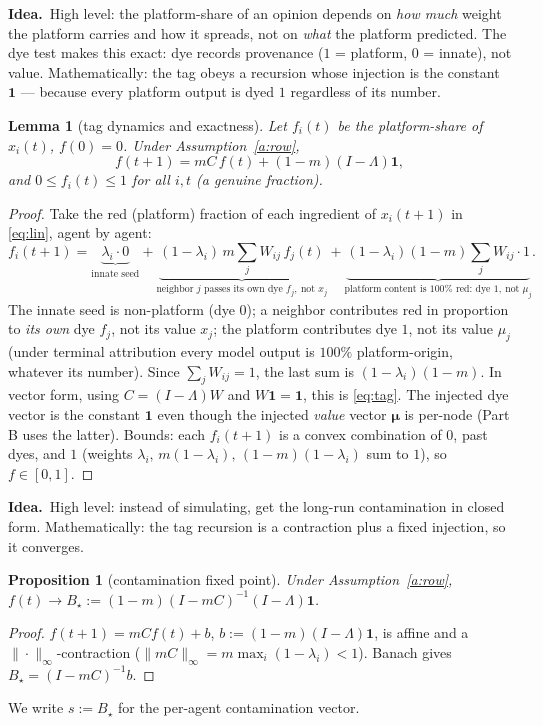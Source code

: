 \documentclass[11pt]{article}
\newtheorem{lemma}{Lemma}
\newtheorem{proposition}{Proposition}
\theoremstyle{definition}
\newcommand{\one}{\mathbf{1}}
\newcommand{\idea}[1]{\par\medskip\noindent\textbf{Idea.}\ #1\par\medskip}
\begin{document}
\idea{High level: the platform-share of an opinion depends on \emph{how much} weight the
platform carries and how it spreads, not on \emph{what} the platform predicted. The dye
test makes this exact: dye records provenance ($1$ = platform, $0$ = innate), not value.
Mathematically: the tag obeys a recursion whose injection is the constant $\one$ ---
because every platform output is dyed $1$ regardless of its number.}

\begin{lemma}[tag dynamics and exactness]\label{lem:tag}
Let $f_i(t)$ be the platform-share of $x_i(t)$, $f(0)=0$. Under Assumption~\ref{a:row},
\begin{equation}\label{eq:tag}
f(t+1)=mC\,f(t)+(1-m)(I-\Lambda)\one,
\end{equation}
and $0\le f_i(t)\le1$ for all $i,t$ (a genuine fraction).
\end{lemma}
\begin{proof}
Take the red (platform) fraction of each ingredient of $x_i(t+1)$ in \eqref{eq:lin},
agent by agent:
\[
f_i(t+1)=\underbrace{\lambda_i\cdot 0}_{\text{innate seed}}
+\underbrace{(1-\lambda_i)\,m\textstyle\sum_j W_{ij}\,f_j(t)}_{\text{neighbor }j\text{ passes its own dye }f_j,\ \text{not }x_j}
+\underbrace{(1-\lambda_i)(1-m)\textstyle\sum_j W_{ij}\cdot 1}_{\text{platform content is }100\%\text{ red: dye }1,\ \text{not }\mu_j}.
\]
The innate seed is non-platform (dye $0$); a neighbor contributes red in proportion to
\emph{its own} dye $f_j$, not its value $x_j$; the platform contributes dye $1$, not its
value $\mu_j$ (under terminal attribution every model output is $100\%$ platform-origin,
whatever its number). Since $\sum_j W_{ij}=1$, the last sum is $(1-\lambda_i)(1-m)$. In
vector form, using $C=(I-\Lambda)W$ and $W\one=\one$, this is \eqref{eq:tag}. The injected
dye vector is the constant $\one$ even though the injected \emph{value} vector $\bm{\mu}$
is per-node (Part B uses the latter). Bounds: each $f_i(t+1)$ is a convex combination of
$0$, past dyes, and $1$ (weights $\lambda_i,\,m(1-\lambda_i),\,(1-m)(1-\lambda_i)$ sum to
$1$), so $f\in[0,1]$.
\end{proof}

\idea{High level: instead of simulating, get the long-run contamination in closed form.
Mathematically: the tag recursion is a contraction plus a fixed injection, so it
converges.}

\begin{proposition}[contamination fixed point]\label{prop:fp}
Under Assumption~\ref{a:row}, $f(t)\to B_\star:=(1-m)(I-mC)^{-1}(I-\Lambda)\one$.
\end{proposition}
\begin{proof}
$f(t+1)=mC f(t)+b$, $b:=(1-m)(I-\Lambda)\one$, is affine and a
$\|\cdot\|_\infty$-contraction ($\|mC\|_\infty=m\max_i(1-\lambda_i)<1$). Banach gives
$B_\star=(I-mC)^{-1}b$.
\end{proof}
We write $s:=B_\star$ for the per-agent contamination vector.
\end{document}
